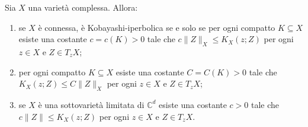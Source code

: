\begin{prop} \label{metrica_bilip}
    Sia $X$ una varietà complessa. Allora:
    \begin{enumerate}[label={(\arabic*)}]
        \item se $X$ è connessa, è Kobayashi-iperbolica se e solo se per ogni compatto $K\subseteq X$ esiste una costante $c=c(K)>0$ tale che $c\|Z\|_X \le K_X(z;Z)$ per ogni $z \in X$ e $Z \in T_zX$;
        \item per ogni compatto $K\subseteq X$ esiste una costante $C=C(K)>0$ tale che $K_X(z;Z) \le C\|Z\|_X$ per ogni $z \in X$ e $Z \in T_zX$;
        \item se $X$ è una sottovarietà limitata di $\mathbb{C}^d$ esiste una costante $c>0$ tale che $c\|Z\| \le K_X(z;Z)$ per ogni $z \in X$ e $Z \in T_zX$.
    \end{enumerate}
\end{prop}

